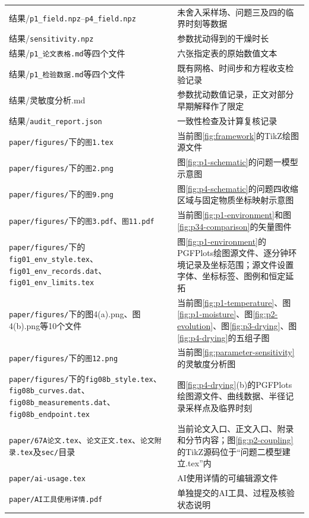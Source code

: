 \begin{appendices}
\begin{longtable}{@{}>{\raggedright\arraybackslash}p{}>{\raggedright\arraybackslash}p{}@{}}
结果/\texttt{p1\_field.npz}--\texttt{p4\_field.npz}&未舍入采样场、问题三及四的临界时刻等数据\\
结果/\texttt{sensitivity.npz}&参数扰动得到的干燥时长\\
结果/\texttt{p1\_论文表格.md}等四个文件&六张指定表的原始数值文本\\
结果/\texttt{p1\_检验数据.md}等四个文件&既有网格、时间步和方程收支检验记录\\
结果/灵敏度分析.md&参数扰动数值记录，正文对部分早期解释作了限定\\
结果/\texttt{audit\_report.json}&一致性检查及计算复核记录\\
\texttt{paper/figures/}下的\texttt{图1.tex}&当前图\ref{fig:framework}的TikZ绘图源文件\\
\texttt{paper/figures/}下的\texttt{图2.png}&图\ref{fig:p1-schematic}的问题一模型示意图\\
\texttt{paper/figures/}下的\texttt{图9.png}&图\ref{fig:p4-schematic}的问题四收缩区域与固定物质坐标映射示意图\\
\texttt{paper/figures/}下的\texttt{图3.pdf}、\texttt{图11.pdf}&当前图\ref{fig:p1-environment}和图\ref{fig:p34-comparison}的矢量图件\\
\texttt{paper/figures/}下的\texttt{fig01\_env\_style.tex}、\texttt{fig01\_env\_records.dat}、\texttt{fig01\_env\_limits.tex}&图\ref{fig:p1-environment}的PGFPlots绘图源文件、逐分钟环境记录及坐标范围；源文件设置字体、坐标标签、图例和恒定延拓\\
\texttt{paper/figures/}下的图4(a).png、图4(b).png等10个文件&当前图\ref{fig:p1-temperature}、图\ref{fig:p1-moisture}、图\ref{fig:p2-evolution}、图\ref{fig:p3-drying}、图\ref{fig:p4-drying}的五组子图\\
\texttt{paper/figures/}下的\texttt{图12.png}&当前图\ref{fig:parameter-sensitivity}的灵敏度分析图\\
\texttt{paper/figures/}下的\texttt{fig08b\_style.tex}、\texttt{fig08b\_curves.dat}、\texttt{fig08b\_measurements.dat}、\texttt{fig08b\_endpoint.tex}&图\ref{fig:p4-drying}(b)的PGFPlots绘图源文件、曲线数据、半径记录采样点及临界时刻\\
\texttt{paper/67A论文.tex}、\texttt{论文正文.tex}、\texttt{论文附录.tex}及\texttt{sec/}目录&当前论文入口、正文入口、附录和分节内容；图\ref{fig:p2-coupling}的TikZ源码位于“问题二模型建立.tex”内\\
\texttt{paper/ai-usage.tex}&AI使用详情的可编辑源文件\\
\texttt{paper/AI工具使用详情.pdf}&单独提交的AI工具、过程及核验状态说明\\
\end{longtable}


\end{appendices}
